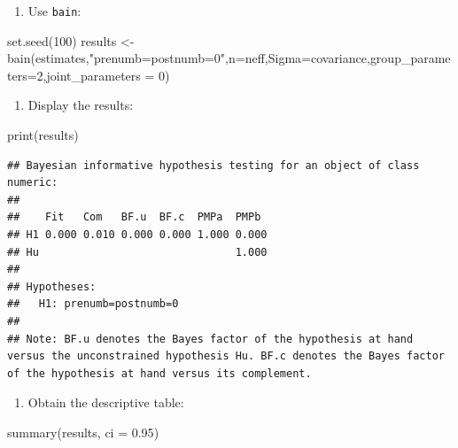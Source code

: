 \documentclass[
]{book}
\newenvironment{Shaded}{\begin{snugshade}}{\end{snugshade}}
\newcommand{\AttributeTok}[1]{\textcolor[rgb]{0.77,0.63,0.00}{#1}}
\newcommand{\DecValTok}[1]{\textcolor[rgb]{0.00,0.00,0.81}{#1}}
\newcommand{\FloatTok}[1]{\textcolor[rgb]{0.00,0.00,0.81}{#1}}
\newcommand{\FunctionTok}[1]{\textcolor[rgb]{0.00,0.00,0.00}{#1}}
\newcommand{\NormalTok}[1]{#1}
\newcommand{\OtherTok}[1]{\textcolor[rgb]{0.56,0.35,0.01}{#1}}
\newcommand{\StringTok}[1]{\textcolor[rgb]{0.31,0.60,0.02}{#1}}
\providecommand{\tightlist}{%
  \setlength{\itemsep}{0pt}\setlength{\parskip}{0pt}}
\begin{document}
\begin{enumerate}
\def\labelenumi{\arabic{enumi}.}
\setcounter{enumi}{5}
\tightlist
\item
  Use \texttt{bain}:
\end{enumerate}

\begin{Shaded}
\begin{Highlighting}[]
\FunctionTok{set.seed}\NormalTok{(}\DecValTok{100}\NormalTok{)}
\NormalTok{results }\OtherTok{\textless{}{-}} \FunctionTok{bain}\NormalTok{(estimates,}\StringTok{"prenumb=postnumb=0"}\NormalTok{,}\AttributeTok{n=}\NormalTok{neff,}\AttributeTok{Sigma=}\NormalTok{covariance,}\AttributeTok{group\_parameters=}\DecValTok{2}\NormalTok{,}\AttributeTok{joint\_parameters =} \DecValTok{0}\NormalTok{)}
\end{Highlighting}
\end{Shaded}

\begin{enumerate}
\def\labelenumi{\arabic{enumi}.}
\setcounter{enumi}{6}
\tightlist
\item
  Display the results:
\end{enumerate}

\begin{Shaded}
\begin{Highlighting}[]
\FunctionTok{print}\NormalTok{(results)}
\end{Highlighting}
\end{Shaded}

\begin{verbatim}
## Bayesian informative hypothesis testing for an object of class numeric:
## 
##    Fit   Com   BF.u  BF.c  PMPa  PMPb 
## H1 0.000 0.010 0.000 0.000 1.000 0.000
## Hu                               1.000
## 
## Hypotheses:
##   H1: prenumb=postnumb=0
## 
## Note: BF.u denotes the Bayes factor of the hypothesis at hand versus the unconstrained hypothesis Hu. BF.c denotes the Bayes factor of the hypothesis at hand versus its complement.
\end{verbatim}

\begin{enumerate}
\def\labelenumi{\arabic{enumi}.}
\setcounter{enumi}{7}
\tightlist
\item
  Obtain the descriptive table:
\end{enumerate}

\begin{Shaded}
\begin{Highlighting}[]
\FunctionTok{summary}\NormalTok{(results, }\AttributeTok{ci =} \FloatTok{0.95}\NormalTok{)}
\end{Highlighting}
\end{Shaded}
\end{document}
